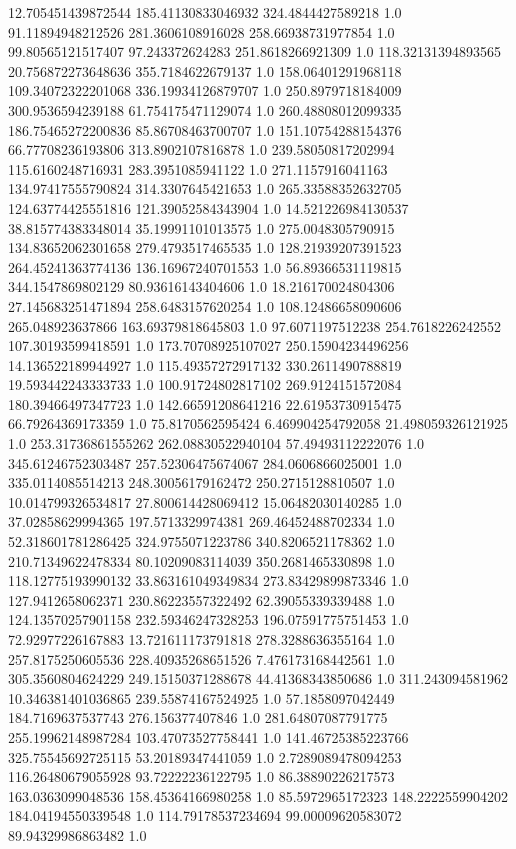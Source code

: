 12.705451439872544	185.41130833046932	324.4844427589218	1.0
91.11894948212526	281.3606108916028	258.66938731977854	1.0
99.80565121517407	97.243372624283	251.8618266921309	1.0
118.32131394893565	20.756872273648636	355.7184622679137	1.0
158.06401291968118	109.34072322201068	336.19934126879707	1.0
250.8979718184009	300.9536594239188	61.754175471129074	1.0
260.48808012099335	186.75465272200836	85.86708463700707	1.0
151.10754288154376	66.77708236193806	313.8902107816878	1.0
239.58050817202994	115.6160248716931	283.3951085941122	1.0
271.1157916041163	134.97417555790824	314.3307645421653	1.0
265.33588352632705	124.63774425551816	121.39052584343904	1.0
14.521226984130537	38.815774383348014	35.19991101013575	1.0
275.0048305790915	134.83652062301658	279.4793517465535	1.0
128.21939207391523	264.45241363774136	136.16967240701553	1.0
56.89366531119815	344.1547869802129	80.93616143404606	1.0
18.216170024804306	27.145683251471894	258.6483157620254	1.0
108.12486658090606	265.048923637866	163.69379818645803	1.0
97.6071197512238	254.7618226242552	107.30193599418591	1.0
173.70708925107027	250.15904234496256	14.136522189944927	1.0
115.49357272917132	330.2611490788819	19.593442243333733	1.0
100.91724802817102	269.9124151572084	180.39466497347723	1.0
142.66591208641216	22.61953730915475	66.79264369173359	1.0
75.8170562595424	6.469904254792058	21.498059326121925	1.0
253.31736861555262	262.08830522940104	57.49493112222076	1.0
345.61246752303487	257.52306475674067	284.0606866025001	1.0
335.0114085514213	248.30056179162472	250.2715128810507	1.0
10.014799326534817	27.800614428069412	15.06482030140285	1.0
37.02858629994365	197.5713329974381	269.46452488702334	1.0
52.318601781286425	324.9755071223786	340.8206521178362	1.0
210.71349622478334	80.10209083114039	350.2681465330898	1.0
118.12775193990132	33.863161049349834	273.83429899873346	1.0
127.9412658062371	230.86223557322492	62.39055339339488	1.0
124.13570257901158	232.59346247328253	196.07591775751453	1.0
72.92977226167883	13.721611173791818	278.3288636355164	1.0
257.8175250605536	228.40935268651526	7.476173168442561	1.0
305.3560804624229	249.15150371288678	44.41368343850686	1.0
311.243094581962	10.346381401036865	239.55874167524925	1.0
57.1858097042449	184.7169637537743	276.156377407846	1.0
281.64807087791775	255.19962148987284	103.47073527758441	1.0
141.46725385223766	325.75545692725115	53.20189347441059	1.0
2.7289089478094253	116.26480679055928	93.72222236122795	1.0
86.38890226217573	163.0363099048536	158.45364166980258	1.0
85.5972965172323	148.2222559904202	184.04194550339548	1.0
114.79178537234694	99.00009620583072	89.94329986863482	1.0
